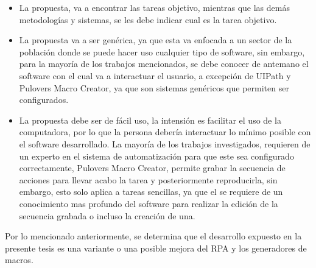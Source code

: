 \begin{itemize}

\item {La propuesta, va a encontrar las tareas objetivo, mientras que las
 dem\'as metodolog\'ias y sistemas, se les debe indicar cual es la tarea
 objetivo.}

\item {La propuesta va a ser gen\'erica, ya que esta va enfocada a un sector
 de la poblaci\'on donde se puede hacer uso cualquier tipo de software, sin
 embargo, para la mayor\'ia de los trabajos mencionados, se debe conocer de
 antemano el software con el cual va a interactuar el usuario, a excepci\'on
 de UIPath y Pulover\textsc{}s Macro Creator, ya que son sistemas
 gen\'ericos que permiten ser configurados.}

\item {La propuesta debe ser de f\'acil uso, la intensi\'on es facilitar el
 uso de la computadora, por lo que la persona deber\'ia interactuar lo
 m\'inimo posible con el software desarrollado. La mayor\'ia de los trabajos 
 investigados, requieren de un experto en el sistema de automatizaci\'on para 
 que este sea configurado correctamente, Pulover\textsc{}s Macro 
 Creator, permite grabar la secuencia de acciones para llevar acabo la tarea 
 y posteriormente reproducirla, sin embargo, esto solo aplica a tareas 
 sencillas, ya que el se requiere de un conocimiento mas profundo del 
 software para realizar la edici\'on de la secuencia grabada o incluso la 
 creaci\'on de una.}

\end{itemize}


Por lo mencionado anteriormente, se determina que el desarrollo expuesto en
 la presente tesis es una variante o una posible mejora del RPA y los
 generadores de macros.

